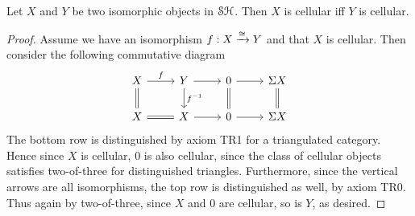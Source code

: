 \documentclass[../main.tex]{subfiles}
\begin{document}
\begin{lemma}\label{cellular_closed_under_iso}
	Let $X$ and $Y$ be two isomorphic objects in $\mathcal{SH}$. Then $X$ is cellular iff $Y$ is cellular.
\end{lemma}
\begin{proof}
	Assume we have an isomorphism $f:X\xrightarrow\cong Y$ and that $X$ is cellular. Then consider the following commutative diagram
	\[\begin{tikzcd}
		X & Y & 0 & {\Sigma X} \\
		X & X & 0 & {\Sigma X}
		\arrow["f", from=1-1, to=1-2]
		\arrow[from=1-2, to=1-3]
		\arrow[from=1-3, to=1-4]
		\arrow["{f^{-1}}", from=1-2, to=2-2]
		\arrow[Rightarrow, no head, from=1-1, to=2-1]
		\arrow[Rightarrow, no head, from=2-1, to=2-2]
		\arrow[from=2-2, to=2-3]
		\arrow[from=2-3, to=2-4]
		\arrow[Rightarrow, no head, from=1-4, to=2-4]
		\arrow[Rightarrow, no head, from=1-3, to=2-3]
	\end{tikzcd}\]
	The bottom row is distinguished by axiom TR1 for a triangulated category. Hence since $X$ is cellular, $0$ is also cellular, since the class of cellular objects satisfies two-of-three for distinguished triangles. Furthermore, since the vertical arrows are all isomorphisms, the top row is distinguished as well, by axiom TR0. Thus again by two-of-three, since $X$ and $0$ are cellular, so is $Y$, as desired.
\end{proof}
\end{document}
